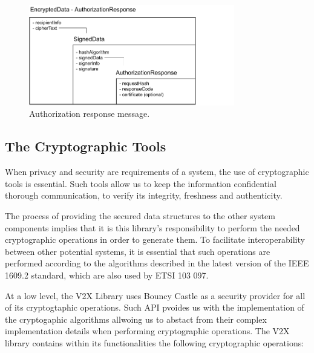 \begin{figure}
	\centering
	\includegraphics[width=0.8\textwidth]{Figures/authorizationresponse}
	\caption{\label{fig:authorization_response}Authorization response message.}
\end{figure}


\subsection{The Cryptographic Tools}
When privacy and security are requirements of a system, the use of cryptographic tools is essential. Such tools allow us to keep the information confidential thorough communication, to verify its integrity, freshness and authenticity.

The process of providing the secured data structures to the other system components implies that it is this library’s responsibility to perform the needed cryptographic operations in order to generate them. To facilitate interoperability between other potential systems, it is essential that such operations are performed according to the algorithms described in the latest version of the IEEE 1609.2 standard, which are also used by ETSI 103 097.

At a low level, the V2X Library uses Bouncy Castle as a security provider for all of its cryptogtaphic operations. Such API pvoides us with the implementation of the cryptogaphic algorithms allwoing us to abstact from their complex implementation details when performing cryptographic operations.
The V2X library contains within its functionalities the following cryptographic operations: 

